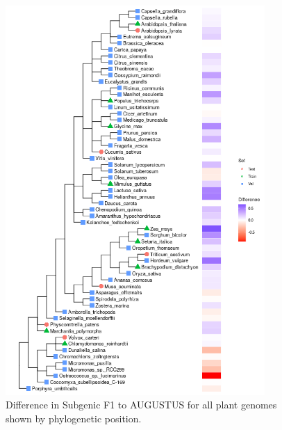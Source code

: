 \documentclass{article}
\renewcommand{\thefigure}{S\arabic{figure}}
\def \tablescale{0.88}
\begin{document}
\begin{figure}[!h]
\label{supfig:phylogeny_differences_plants}
\centerline{\includegraphics[width=\tablescale\textwidth]{images/plants_differences}}
\caption{Difference in Subgenic F1 to AUGUSTUS for all plant genomes shown by phylogenetic position.}
\end{figure}


\clearpage
\end{document}
